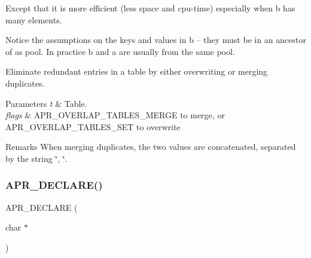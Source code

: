 Except that it is more efficient (less space and cpu-\/time) especially when b has many elements.

Notice the assumptions on the keys and values in b -- they must be in an ancestor of a\textquotesingle{}s pool. In practice b and a are usually from the same pool.

Eliminate redundant entries in a table by either overwriting or merging duplicates.


\begin{DoxyParams}{Parameters}
{\em t} & Table. \\
\hline
{\em flags} & A\+P\+R\+\_\+\+O\+V\+E\+R\+L\+A\+P\+\_\+\+T\+A\+B\+L\+E\+S\+\_\+\+M\+E\+R\+GE to merge, or A\+P\+R\+\_\+\+O\+V\+E\+R\+L\+A\+P\+\_\+\+T\+A\+B\+L\+E\+S\+\_\+\+S\+ET to overwrite \\
\hline
\end{DoxyParams}
\begin{DoxyRemark}{Remarks}
When merging duplicates, the two values are concatenated, separated by the string \char`\"{}, \char`\"{}. 
\end{DoxyRemark}
\mbox{\label{group__apr__tables_ga76c651e5101e99d13ab524734b2cead1}} 
\subsubsection{\texorpdfstring{A\+P\+R\+\_\+\+D\+E\+C\+L\+A\+R\+E()}{APR\_DECLARE()}\hspace{0.1cm}{\footnotesize\ttfamily [6/8]}}
{\footnotesize\ttfamily A\+P\+R\+\_\+\+D\+E\+C\+L\+A\+RE (\begin{DoxyParamCaption}\item[{char $\ast$}]{ }\end{DoxyParamCaption})}

